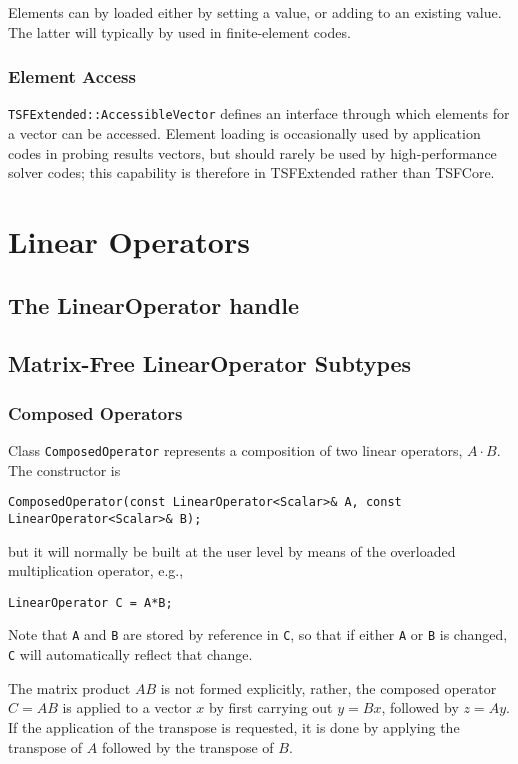 Elements can by loaded either by setting a value, or adding to an
existing value. The latter will typically by used in
finite-element codes.


\subsubsection{Element Access}

\verb+TSFExtended::AccessibleVector+ defines an interface through which
elements for a vector can be accessed. Element loading is occasionally
used by application codes in probing results vectors, 
but should rarely be used by high-performance solver codes; this 
capability is therefore in TSFExtended rather than TSFCore.

\section{Linear Operators}

\subsection{The LinearOperator handle}

\subsection{Matrix-Free LinearOperator Subtypes}

\subsubsection{Composed Operators}

Class \verb+ComposedOperator+ represents a composition of two linear
operators, $A\cdot B$. The constructor is 
{\scriptsize\begin{verbatim}
ComposedOperator(const LinearOperator<Scalar>& A, const LinearOperator<Scalar>& B);
\end{verbatim}}
but it will normally be built at the user level by means of the overloaded
multiplication operator, e.g., 
{\scriptsize\begin{verbatim}
LinearOperator C = A*B;
\end{verbatim}}
Note that  \verb+A+ and \verb+B+ are stored by reference in \verb+C+, so that 
if either \verb+A+ or \verb+B+
is changed,  \verb+C+ will automatically reflect that change.

The matrix product $AB$ is not formed explicitly, rather, the composed
operator $C=AB$ is applied to a vector $x$ by first carrying out $y=B x$, followed
by $z=Ay$. If the application of the transpose is requested, it is done by applying
the transpose of $A$ followed by the transpose of $B$.

